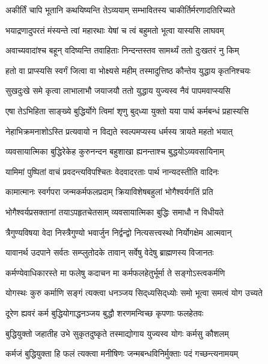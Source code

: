 \twolineshloka
{अकीर्तिं चापि भूतानि कथयिष्यन्ति तेऽव्ययाम्}
{सम्भावितस्य चाकीर्तिर्मरणादतिरिच्यते}%

\twolineshloka
{भयाद्रणादुपरतं मंस्यन्ते त्वां महारथाः}
{येषां च त्वं बहुमतो भूत्वा यास्यसि लाघवम्}%

\twolineshloka
{अवाच्यवादांश्च बहून् वदिष्यन्ति तवाहिताः}
{निन्दन्तस्तव सामर्थ्यं ततो दुःखतरं नु किम्}%

\twolineshloka
{हतो वा प्राप्स्यसि स्वर्गं जित्वा वा भोक्ष्यसे महीम्}
{तस्मादुत्तिष्ठ कौन्तेय युद्धाय कृतनिश्चयः}%

\twolineshloka
{सुखदुःखे समे कृत्वा लाभालाभौ जयाजयौ}
{ततो युद्धाय युज्यस्व नैवं पापमवाप्स्यसि}%

\twolineshloka
{एषा तेऽभिहिता साङ्ख्ये बुद्धिर्योगे त्विमां शृणु}
{बुद्‍ध्या युक्तो यया पार्थ कर्मबन्धं प्रहास्यसि}%

\twolineshloka
{नेहाभिक्रमनाशोऽस्ति प्रत्यवायो न विद्यते}
{स्वल्पमप्यस्य धर्मस्य त्रायते महतो भयात्}%

\twolineshloka
{व्यवसायात्मिका बुद्धिरेकेह कुरुनन्दन}
{बहुशाखा ह्यनन्ताश्च बुद्धयोऽव्यवसायिनाम्}%

\twolineshloka
{यामिमां पुष्पितां वाचं प्रवदन्त्यविपश्चितः}
{वेदवादरताः पार्थ नान्यदस्तीति वादिनः}%

\twolineshloka
{कामात्मानः स्वर्गपरा जन्मकर्मफलप्रदाम्}
{क्रियाविशेषबहुलां भोगैश्वर्यगतिं प्रति}%

\twolineshloka
{भोगैश्वर्यप्रसक्तानां तयाऽपहृतचेतसाम्}
{व्यवसायात्मिका बुद्धिः समाधौ न विधीयते}%

\twolineshloka
{त्रैगुण्यविषया वेदा निस्त्रैगुण्यो भवार्जुन}
{निर्द्वन्द्वो नित्यसत्त्वस्थो निर्योगक्षेम आत्मवान्}%

\twolineshloka
{यावानर्थ उदपाने सर्वतः सम्प्लुतोदके}
{तावान् सर्वेषु वेदेषु ब्राह्मणस्य विजानतः}%

\twolineshloka
{कर्मण्येवाधिकारस्ते मा फलेषु कदाचन}
{मा कर्मफलहेतुर्भूर्मा ते सङ्गोऽस्त्वकर्मणि}%

\twolineshloka
{योगस्थः कुरु कर्माणि सङ्गं त्यक्त्वा धनञ्जय}
{सिद्‌ध्यसिद्‌ध्योः समो भूत्वा समत्वं योग उच्यते}%

\twolineshloka
{दूरेण ह्यवरं कर्म बुद्धियोगाद्धनञ्जय}
{बुद्धौ शरणमन्विच्छ कृपणाः फलहेतवः}%

\twolineshloka
{बुद्धियुक्तो जहातीह उभे सुकृतदुष्कृते}
{तस्माद्योगाय युज्यस्व योगः कर्मसु कौशलम्}%

\twolineshloka
{कर्मजं बुद्धियुक्ता हि फलं त्यक्त्वा मनीषिणः}
{जन्मबन्धविनिर्मुक्ताः पदं गच्छन्त्यनामयम्}%

